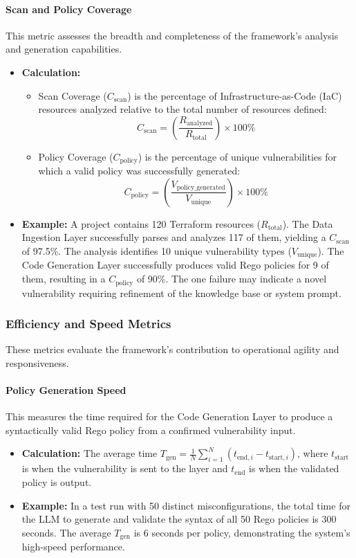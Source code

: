 \paragraph{Scan and Policy Coverage} This metric assesses the breadth and completeness of the framework's analysis and generation capabilities.
\begin{itemize}
    \item \textbf{Calculation:}
        \begin{itemize}
            \item Scan Coverage (\( C_{\text{scan}} \)) is the percentage of Infrastructure-as-Code (IaC) resources analyzed relative to the total number of resources defined:
            \[ C_{\text{scan}} = \left(\frac{R_{\text{analyzed}}}{R_{\text{total}}}\right) \times 100\% \]
            \item Policy Coverage (\( C_{\text{policy}} \)) is the percentage of unique vulnerabilities for which a valid policy was successfully generated:
            \[ C_{\text{policy}} = \left(\frac{V_{\text{policy\_generated}}}{V_{\text{unique}}}\right) \times 100\% \]
        \end{itemize}
    \item \textbf{Example:} A project contains 120 Terraform resources (\( R_{\text{total}} \)). The Data Ingestion Layer successfully parses and analyzes 117 of them, yielding a \( C_{\text{scan}} \) of 97.5\%. The analysis identifies 10 unique vulnerability types (\( V_{\text{unique}} \)). The Code Generation Layer successfully produces valid Rego policies for 9 of them, resulting in a \( C_{\text{policy}} \) of 90\%. The one failure may indicate a novel vulnerability requiring refinement of the knowledge base or system prompt.
\end{itemize}

\subsubsection*{Efficiency and Speed Metrics}
These metrics evaluate the framework's contribution to operational agility and responsiveness.

\paragraph{Policy Generation Speed} This measures the time required for the Code Generation Layer to produce a syntactically valid Rego policy from a confirmed vulnerability input.
\begin{itemize}
    \item \textbf{Calculation:} The average time \( T_{\text{gen}} = \frac{1}{N} \sum_{i=1}^{N} (t_{\text{end},i} - t_{\text{start},i}) \), where \( t_{\text{start}} \) is when the vulnerability is sent to the layer and \( t_{\text{end}} \) is when the validated policy is output.
    \item \textbf{Example:} In a test run with 50 distinct misconfigurations, the total time for the LLM to generate and validate the syntax of all 50 Rego policies is 300 seconds. The average \( T_{\text{gen}} \) is 6 seconds per policy, demonstrating the system's high-speed performance.
\end{itemize}

